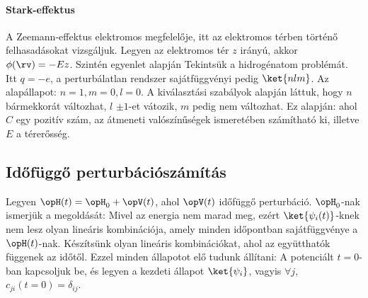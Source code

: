    \paragraph{Stark-effektus}
    
    A Zeemann-effektus elektromos megfelelője, itt az elektromos térben történő felhasadásokat vizsgáljuk.
   Legyen az elektromos tér $z$ irányú, akkor $\phi(\rv)=-Ez$.
   Szintén  egyenlet alapján
    Tekintsük a hidrogénatom problémát.
   Itt $q=-e$, a perturbálatlan rendszer sajátfüggvényi pedig $\ket{nlm}$.
   Az alapállapot: $n=1, m=0, l=0$.
   A kiválasztási szabályok alapján láttuk, hogy $n$ bármekkorát változhat, $l$ $\pm 1$-et vátozik, $m$ pedig nem változhat.
   Ez alapján:
    ahol $C$ egy pozitív szám, az átmeneti valószínűségek ismeretében számítható ki, illetve $E$ a térerősség. 
   
  \subsection{Időfüggő perturbációszámítás}
   
   Legyen $\opH(t)=\opH_0+\opV(t)$, ahol $\opV(t)$ időfüggő perturbáció. $\opH_0$-nak ismerjük a megoldását:
   Mivel az energia nem marad meg, ezért $\ket{\psi_i(t)}$-knek nem lesz olyan lineáris kombinációja, amely minden időpontban sajátfüggvénye a $\opH(t)$-nak.
   Készítsünk olyan lineáris kombinációkat, ahol az együtthatók függenek az időtől.
   Ezzel minden állapotot elő tudunk állítani:
   A potenciált $t=0$-ban kapcsoljuk be, és legyen a kezdeti állapot $\ket{\psi_i}$, vagyis $\forall j$, $c_{ji}(t=0)=\delta_{ij}$.
   
